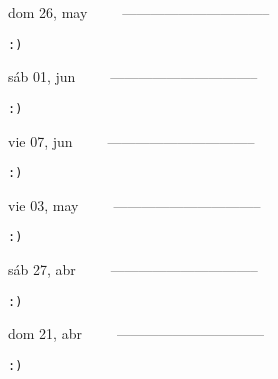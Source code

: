 \documentclass[letterpaper,10pt]{article}
\begin{document}
\begin{multicols}{3}
{dom 26, may\ \ \ \ \ --------------------------------}
\begin{flushright}\begin{small}\texttt{:)}\end{small}\end{flushright}
\vfill
{sáb 01, jun\ \ \ \ \ --------------------------------}
\begin{flushright}\begin{small}\texttt{:)}\end{small}\end{flushright}\par
\vfill
{vie 07, jun\ \ \ \ \ --------------------------------}
\begin{flushright}\begin{small}\texttt{:)}\end{small}\end{flushright}\par
\vfill
\end{multicols}
\vspace{1.05cm}

\begin{multicols}{3}
{vie 03, may\ \ \ \ \ --------------------------------}
\begin{flushright}\begin{small}\texttt{:)}\end{small}\end{flushright}
\vfill
{sáb 27, abr\ \ \ \ \ --------------------------------}
\begin{flushright}\begin{small}\texttt{:)}\end{small}\end{flushright}\par
\vfill
{dom 21, abr\ \ \ \ \ --------------------------------}
\begin{flushright}\begin{small}\texttt{:)}\end{small}\end{flushright}\par
\vfill
\end{multicols}
\vspace{1.05cm}
\end{document}
